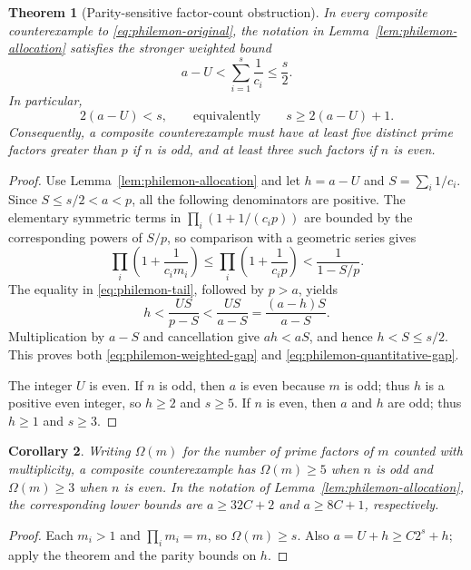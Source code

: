 \documentclass[11pt,a4paper]{article}
\newtheorem{theorem}{Theorem}[section]
\newtheorem{corollary}[theorem]{Corollary}
\theoremstyle{definition}\newtheorem{definition}[theorem]{Definition}
\theoremstyle{remark}\newtheorem{remark}[theorem]{Remark}
\begin{document}
\begin{theorem}[Parity-sensitive factor-count obstruction]
\label{thm:philemon-factor-count}
In every composite counterexample to \eqref{eq:philemon-original}, the
notation in Lemma~\ref{lem:philemon-allocation} satisfies the stronger
weighted bound
\begin{equation}\label{eq:philemon-weighted-gap}
 a-U<\sum_{i=1}^s\frac1{c_i}\leq\frac{s}{2}.
\end{equation}
In particular,
\begin{equation}\label{eq:philemon-quantitative-gap}
 2(a-U)<s,
 \qquad\text{equivalently}\qquad s\geq2(a-U)+1.
\end{equation}
Consequently, a composite counterexample must have
at least five distinct prime factors greater than $p$ if $n$ is odd,
and at least three such factors if $n$ is even.
\end{theorem}

\begin{proof}
Use Lemma~\ref{lem:philemon-allocation} and let $h=a-U$ and
$S=\sum_i1/c_i$.  Since $S\leq s/2<a<p$, all the following denominators
are positive.  The elementary symmetric terms in
$\prod_i(1+1/(c_i p))$ are bounded by the corresponding powers of
$S/p$, so comparison with a geometric series gives
\[
 \prod_i\left(1+\frac1{c_i m_i}\right)
 \leq\prod_i\left(1+\frac1{c_i p}\right)
 <\frac1{1-S/p}.
\]
The equality in \eqref{eq:philemon-tail}, followed by $p>a$, yields
\[
 h<\frac{US}{p-S}<\frac{US}{a-S}
   =\frac{(a-h)S}{a-S}.
\]
Multiplication by $a-S$ and cancellation give $ah<aS$, and hence
$h<S\leq s/2$.  This proves both
\eqref{eq:philemon-weighted-gap} and
\eqref{eq:philemon-quantitative-gap}.

The integer $U$ is even.  If $n$ is odd, then $a$ is even because
$m$ is odd; thus $h$ is a positive even integer, so $h\geq2$ and
$s\geq5$.  If $n$ is even, then $a$ and $h$ are odd; thus $h\geq1$
and $s\geq3$.
\end{proof}

\begin{corollary}
Writing $\Omega(m)$ for the number of prime factors of $m$ counted with
multiplicity, a composite counterexample has $\Omega(m)\geq5$ when
$n$ is odd and $\Omega(m)\geq3$ when $n$ is even.  In the notation of
Lemma~\ref{lem:philemon-allocation}, the corresponding lower bounds are
$a\geq32C+2$ and $a\geq8C+1$, respectively.
\end{corollary}

\begin{proof}
Each $m_i>1$ and $\prod_i m_i=m$, so $\Omega(m)\geq s$.
Also $a=U+h\geq C2^s+h$; apply the theorem and the parity bounds on $h$.
\end{proof}
\end{document}
